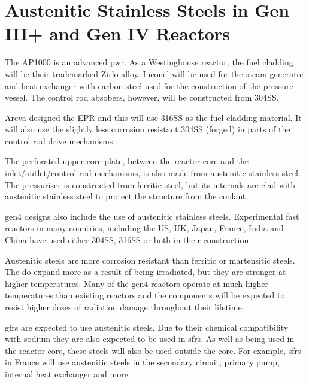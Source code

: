 \FloatBarrier



\section[SS in Gen III+ and Gen IV]{Austenitic Stainless Steels in Gen III+ and Gen IV Reactors}

The AP1000 is an advanced \acrshort{pwr}.  As a Westinghouse reactor, the fuel cladding will be their trademarked Zirlo alloy.  Inconel will be used for the steam generator and heat exchanger with carbon steel used for the construction of the pressure vessel.  The control rod absobers, however, will be constructed from \gls{304SS}\cite{ap1000mat}.

Areva designed the EPR and this will use \gls{316SS} as the fuel cladding material.  It will also use the slightly less corrosion resistant \gls{304SS} (forged) in parts of the control rod drive mechanisms\cite{eprmat}.

The perforated upper core plate, between the reactor core and the inlet/outlet/control rod mechanisms, is also made from austenitic stainless steel.  The pressuriser is constructed from ferritic steel, but its internals are clad with austenitic stainless steel to protect the structure from the coolant.

\acrshort{gen4} designs also include the use of austenitic stainless steels.  Experimental fast reactors in many countries, including the US, UK, Japan, France, India and China have used either \gls{304SS}, \gls{316SS} or both in their construction.

Austenitic steels are more corrosion resistant than ferritic or martensitic steels.  The do expand more as a result of being irradiated, but they are stronger at higher temperatures.  Many of the \acrshort{gen4} reactors operate at much higher temperatures than existing reactors and the components will be expected to resist higher doses of radiation damage throughout their lifetime.

\acrshort{gfr}s are expected to use austenitic steels.  Due to their chemical compatibility with sodium they are also expected to be used in \acrshort{sfr}s.  As well as being used in the reactor core, these steels will also be used outside the core.  For example, \acrshort{sfr}s in France will use austenitic steels in the secondary circuit, primary pump, internal heat exchanger and more\cite{convsteelooc}.


\FloatBarrier



